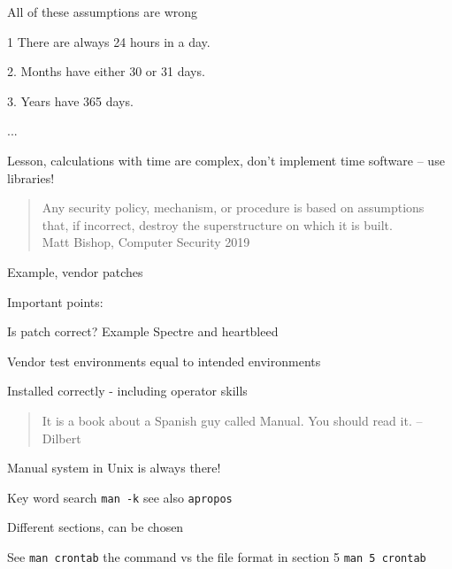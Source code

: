 \documentclass[Screen16to9,17pt]{foils}
\begin{document}
All of these assumptions are wrong
\begin{list2}
\item
\item 1 There are always 24 hours in a day.
\item 2. Months have either 30 or 31 days.
\item 3. Years have 365 days.
\item ...
\end{list2}

\centerline{Lesson, calculations with time are complex, don't implement time software -- use libraries!}


\begin{quote}
Any security policy, mechanism, or procedure is based on assumptions that, if incorrect, destroy the superstructure on which it is built.\\
Matt Bishop, Computer Security 2019
\end{quote}

\begin{list1}
\item Example, vendor patches
\item Important points:
\begin{list2}
\item Is patch correct? Example Spectre and heartbleed
\item Vendor test environments equal to intended environments
\item Installed correctly - including operator skills
\end{list2}
\end{list1}




\begin{quote}
 It is a book about a Spanish guy called Manual. You should read it.
       -- Dilbert
\end{quote}

\begin{list1}
\item Manual system in Unix is always there!
\item Key word search \verb+man -k+ see also \verb+apropos+
\item Different sections, can be chosen
\end{list1}

See \verb+man crontab+ the command vs the file format in section 5 \verb+man 5 crontab+
\end{document}
